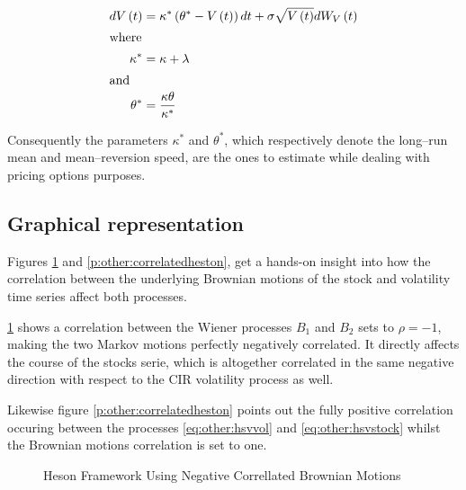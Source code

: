 \documentclass[12pt]{report}
\newcommand{\Bmsub}[1]{W_{#1}\left(t\right)}
\newcommand{\Vt}{V\left(t\right)}
\newcommand{\HSVvolriskless}{
  d\Vt &= \kappa^{*} \left(\theta^{*} - \Vt \right) dt + \sigma \sqrt{\Vt} d \Bmsub{V}
}
\begin{document}
\begin{align}
    \HSVvolriskless \label{eq:other:hsvvol:riskless} \\
    \intertext{where}
    \kappa^{*} & = \kappa + \lambda \\
    \intertext{and}
    \theta^{*} & = \frac{\kappa \theta}{\kappa^{*}}
\end{align}

Consequently the parameters $\kappa^{*}$ and $\theta^{*}$, which respectively denote the long--run mean and mean--reversion speed, are the ones to estimate while dealing with pricing options purposes. 

\subsection{Graphical representation}
\label{sub:other:heston:graphical}   

Figures \ref{p:other:uncorrelatedheston} and \ref{p:other:correlatedheston}, get a hands-on insight into how the correlation between the underlying Brownian motions of the stock and volatility time series affect both processes.

\cref{p:other:uncorrelatedheston} shows a correlation between the Wiener processes $B_1$ and $B_2$ sets to $\rho = -1$, making the two Markov motions perfectly negatively correlated. 
It directly affects the course of the stocks serie, which is altogether correlated in the same negative direction with respect to the CIR volatility process as well.

Likewise figure \ref{p:other:correlatedheston} points out the fully positive correlation occuring between the processes \cref{eq:other:hsvvol} and \cref{eq:other:hsvstock} whilst the Brownian motions correlation is set to one. 

\begin{figure}[H]
\centering
 
\caption{Heson Framework Using Negative Correllated Brownian Motions}
\label{p:other:uncorrelatedheston}
\end{figure}
\end{document}
